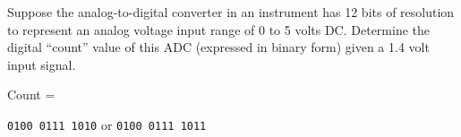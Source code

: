 

Suppose the analog-to-digital converter in an instrument has 12 bits of resolution to represent an analog voltage input range of 0 to 5 volts DC.  Determine the digital ``count'' value of this ADC (expressed in binary form) given a 1.4 volt input signal.

\vskip 10pt

Count = \underbar{\hskip 50pt}

\vskip 10pt







{\tt 0100 0111 1010} \hskip 20pt or \hskip 20pt {\tt 0100 0111 1011}











